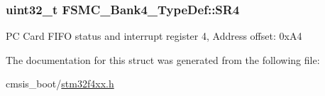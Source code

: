 \subsubsection[{\texorpdfstring{S\+R4}{SR4}}]{ uint32\+\_\+t F\+S\+M\+C\+\_\+\+Bank4\+\_\+\+Type\+Def\+::\+S\+R4}\hypertarget{struct_f_s_m_c___bank4___type_def_a1e0f09be7fa48bb7b14233866da1dd9f}{}\label{struct_f_s_m_c___bank4___type_def_a1e0f09be7fa48bb7b14233866da1dd9f}
PC Card F\+I\+FO status and interrupt register 4, Address offset\+: 0x\+A4 

The documentation for this struct was generated from the following file\+:\begin{DoxyCompactItemize}
\item 
cmsis\+\_\+boot/\hyperlink{stm32f4xx_8h}{stm32f4xx.\+h}\end{DoxyCompactItemize}
